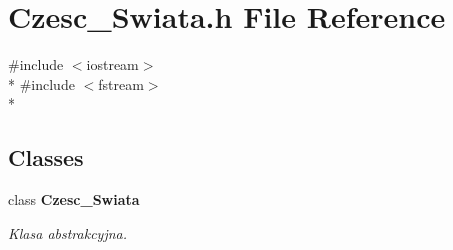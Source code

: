 \section{Czesc\+\_\+\+Swiata.\+h File Reference}
\label{_czesc___swiata_8h}
{\ttfamily \#include $<$iostream$>$}\\*
{\ttfamily \#include $<$fstream$>$}\\*
\subsection*{Classes}
\begin{DoxyCompactItemize}
\item 
class {\bf Czesc\+\_\+\+Swiata}
\begin{DoxyCompactList}\small\item\em Klasa abstrakcyjna. \end{DoxyCompactList}\end{DoxyCompactItemize}
